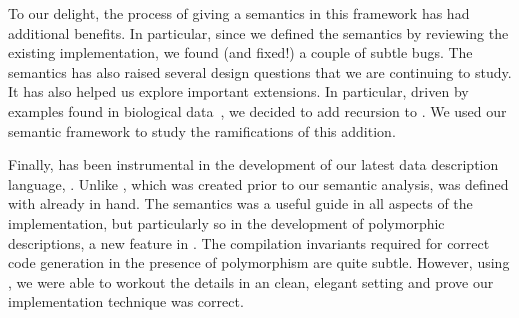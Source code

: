 To our delight, the process of giving \padsc{} 
a semantics in this framework has had additional benefits.  
In particular, since we defined the
semantics by reviewing the existing 
implementation, we found (and fixed!) a couple of subtle bugs.  The semantics has also raised several
design questions that we are continuing to study. 
It has also helped us explore important extensions.
In particular, driven by examples found in biological data~\cite{geneontology,newick}, we decided to add recursion to \padsc{}.
We used our semantic framework to study the ramifications of this addition.

Finally, \ddc{} has been instrumental in the development of our
latest data description language,
\padsml{}.  Unlike \padsc, which was created prior to our semantic analysis,
\padsml{} was defined with \ddc{} already in hand.  The semantics
was a useful guide in all aspects of the \padsml{} implementation, but
particularly so in the development of polymorphic descriptions, a new
feature in \padsml{}.  The compilation invariants required for correct
code generation in the presence of polymorphism are quite subtle.  However,
using \ddc{}, we were able to workout the details in an clean, elegant
setting and prove our implementation technique was correct.

